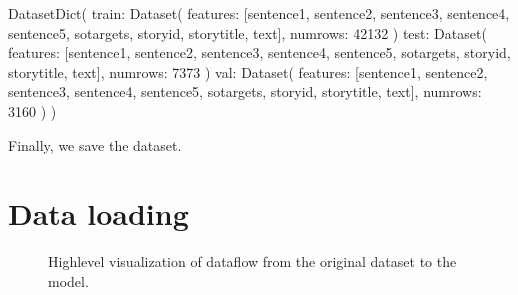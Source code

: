 \documentclass[letterpaper,10pt,english]{jupyterBook}
\begin{document}
\begin{sphinxVerbatimOutput}

\begin{sphinxVerbatim}[commandchars=\\\{\}]
DatasetDict(\PYGZob{}
    train: Dataset(\PYGZob{}
        features: [\PYGZsq{}sentence1\PYGZsq{}, \PYGZsq{}sentence2\PYGZsq{}, \PYGZsq{}sentence3\PYGZsq{}, \PYGZsq{}sentence4\PYGZsq{}, \PYGZsq{}sentence5\PYGZsq{}, \PYGZsq{}so\PYGZus{}targets\PYGZsq{}, \PYGZsq{}storyid\PYGZsq{}, \PYGZsq{}storytitle\PYGZsq{}, \PYGZsq{}text\PYGZsq{}],
        num\PYGZus{}rows: 42132
    \PYGZcb{})
    test: Dataset(\PYGZob{}
        features: [\PYGZsq{}sentence1\PYGZsq{}, \PYGZsq{}sentence2\PYGZsq{}, \PYGZsq{}sentence3\PYGZsq{}, \PYGZsq{}sentence4\PYGZsq{}, \PYGZsq{}sentence5\PYGZsq{}, \PYGZsq{}so\PYGZus{}targets\PYGZsq{}, \PYGZsq{}storyid\PYGZsq{}, \PYGZsq{}storytitle\PYGZsq{}, \PYGZsq{}text\PYGZsq{}],
        num\PYGZus{}rows: 7373
    \PYGZcb{})
    val: Dataset(\PYGZob{}
        features: [\PYGZsq{}sentence1\PYGZsq{}, \PYGZsq{}sentence2\PYGZsq{}, \PYGZsq{}sentence3\PYGZsq{}, \PYGZsq{}sentence4\PYGZsq{}, \PYGZsq{}sentence5\PYGZsq{}, \PYGZsq{}so\PYGZus{}targets\PYGZsq{}, \PYGZsq{}storyid\PYGZsq{}, \PYGZsq{}storytitle\PYGZsq{}, \PYGZsq{}text\PYGZsq{}],
        num\PYGZus{}rows: 3160
    \PYGZcb{})
\PYGZcb{})
\end{sphinxVerbatim}
\end{sphinxVerbatimOutput}

\sphinxAtStartPar
Finally, we save the dataset.
\begin{sphinxVerbatimInput}

\begin{sphinxVerbatim}[commandchars=\\\{\}]
\end{sphinxVerbatim}
\end{sphinxVerbatimInput}


\section{Data loading}
\label{\detokenize{Prerequisites:data-loading}}
\begin{figure}[htbp]
\centering
\capstart

\noindent{}
\caption{High\sphinxhyphen{}level visualization of data\sphinxhyphen{}flow from the original dataset to the model.}\label{\detokenize{Prerequisites:fig-dataflow}}\end{figure}
\end{document}
